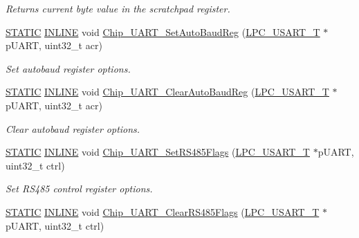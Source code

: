\begin{DoxyCompactItemize}
\begin{DoxyCompactList}\small\item\em Returns current byte value in the scratchpad register. \end{DoxyCompactList}\item 
\hyperlink{group___l_p_c___types___public___macros_ga10b2d890d871e1489bb02b7e70d9bdfb}{S\+T\+A\+T\+IC} \hyperlink{spifi__18xx__43xx_8h_a2eb6f9e0395b47b8d5e3eeae4fe0c116}{I\+N\+L\+I\+NE} void \hyperlink{group___u_a_r_t__18_x_x__43_x_x_ga4ae4f3c36bdae1bf8a93c0420ee74b40}{Chip\+\_\+\+U\+A\+R\+T\+\_\+\+Set\+Auto\+Baud\+Reg} (\hyperlink{struct_l_p_c___u_s_a_r_t___t}{L\+P\+C\+\_\+\+U\+S\+A\+R\+T\+\_\+T} $\ast$p\+U\+A\+RT, uint32\+\_\+t acr)
\begin{DoxyCompactList}\small\item\em Set autobaud register options. \end{DoxyCompactList}\item 
\hyperlink{group___l_p_c___types___public___macros_ga10b2d890d871e1489bb02b7e70d9bdfb}{S\+T\+A\+T\+IC} \hyperlink{spifi__18xx__43xx_8h_a2eb6f9e0395b47b8d5e3eeae4fe0c116}{I\+N\+L\+I\+NE} void \hyperlink{group___u_a_r_t__18_x_x__43_x_x_ga6a6d30f304047175780d16207bab2b09}{Chip\+\_\+\+U\+A\+R\+T\+\_\+\+Clear\+Auto\+Baud\+Reg} (\hyperlink{struct_l_p_c___u_s_a_r_t___t}{L\+P\+C\+\_\+\+U\+S\+A\+R\+T\+\_\+T} $\ast$p\+U\+A\+RT, uint32\+\_\+t acr)
\begin{DoxyCompactList}\small\item\em Clear autobaud register options. \end{DoxyCompactList}\item 
\hyperlink{group___l_p_c___types___public___macros_ga10b2d890d871e1489bb02b7e70d9bdfb}{S\+T\+A\+T\+IC} \hyperlink{spifi__18xx__43xx_8h_a2eb6f9e0395b47b8d5e3eeae4fe0c116}{I\+N\+L\+I\+NE} void \hyperlink{group___u_a_r_t__18_x_x__43_x_x_ga0bf41455dd390ae86f95f4bfe43a49a2}{Chip\+\_\+\+U\+A\+R\+T\+\_\+\+Set\+R\+S485\+Flags} (\hyperlink{struct_l_p_c___u_s_a_r_t___t}{L\+P\+C\+\_\+\+U\+S\+A\+R\+T\+\_\+T} $\ast$p\+U\+A\+RT, uint32\+\_\+t ctrl)
\begin{DoxyCompactList}\small\item\em Set R\+S485 control register options. \end{DoxyCompactList}\item 
\hyperlink{group___l_p_c___types___public___macros_ga10b2d890d871e1489bb02b7e70d9bdfb}{S\+T\+A\+T\+IC} \hyperlink{spifi__18xx__43xx_8h_a2eb6f9e0395b47b8d5e3eeae4fe0c116}{I\+N\+L\+I\+NE} void \hyperlink{group___u_a_r_t__18_x_x__43_x_x_ga27379f3351109d53453dfe4833e3f350}{Chip\+\_\+\+U\+A\+R\+T\+\_\+\+Clear\+R\+S485\+Flags} (\hyperlink{struct_l_p_c___u_s_a_r_t___t}{L\+P\+C\+\_\+\+U\+S\+A\+R\+T\+\_\+T} $\ast$p\+U\+A\+RT, uint32\+\_\+t ctrl)

\end{DoxyCompactItemize}
